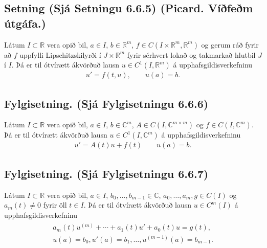 \documentclass[a4paper,10pt,icelandic]{sphinxmanual}
\begin{document}
\subsection{Setning (Sjá Setningu 6.6.5) (Picard. Víðfeðm útgáfa.)}
\label{\detokenize{Kafli06:setning-sja-setningu-6-6-5-picard-vifem-utgafa}}
Látum \(I\subset \mathbb{R}\) vera opið bil, \(a\in I\), \(b\in \mathbb{R}^m\), \(f\in C(I\times \mathbb{R}^m,\mathbb{R}^m)\) og gerum ráð fyrir að \(f\) uppfylli Lipschitz\textendash{}skilyrði í \(J\times \mathbb{R}^m\) fyrir sérhvert lokað og takmarkað hlutbil \(J\) í \(I\). Þá er til ótvírætt ákvörðuð lausn \(u\in C^1(I,\mathbb{R}^ m)\) á upphafsgildisverkefninu
\begin{equation*}
\begin{split}u'=f(t,u), \qquad u(a)=b.\end{split}
\end{equation*}

\subsection{Fylgisetning. (Sjá Fylgisetningu 6.6.6)}
\label{\detokenize{Kafli06:fylgisetning-sja-fylgisetningu-6-6-6}}
Látum \(I\subset \mathbb{R}\) vera opið bil, \(a\in I\), \(b\in {\mathbb{C}}^m\), \(A\in C(I,{\mathbb{C}}^{m\times m})\) og \(f\in C(I,{\mathbb{C}}^m)\). Þá er til ótvírætt ákvörðuð lausn \(u\in C^1(I,{\mathbb{C}}^ m)\) á upphafsgildisverkefninu
\begin{equation*}
\begin{split}u'=A(t)u+f(t) \qquad u(a)=b.\end{split}
\end{equation*}

\subsection{Fylgisetning. (Sjá Fylgisetningu 6.6.7)}
\label{\detokenize{Kafli06:fylgisetning-sja-fylgisetningu-6-6-7}}
Látum \(I\subset \mathbb{R}\) vera opið bil, \(a\in I\), \(b_0,\dots,b_{m-1} \in {\mathbb{C}}\), \(a_0,\dots,a_m, g\in C(I)\) og \(a_m(t)\neq 0\) fyrir öll \(t\in I\). Þá er til ótvírætt ákvörðuð lausn \(u\in C^m(I)\) á upphafsgildisverkefninu
\begin{equation*}
\begin{split}\begin{gathered}
a_m(t)u^{(m)}+\cdots+a_1(t)u'+a_0(t)u=g(t),\\
u(a)=b_0, u'(a)=b_1,\dots, u^{(m-1)}(a)=b_{m-1}.\end{gathered}\end{split}
\end{equation*}
\end{document}

